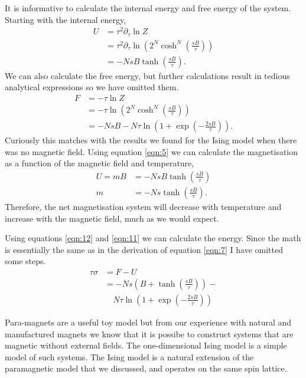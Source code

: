 \documentclass[a4paper, twocolumn]{article}
\begin{document}
It is informative to calculate the internal energy and free %
energy of the system. Starting with the internal energy,
%
\begin{align}
    U &= \tau^{2}\partial_{\tau}\ln Z\nonumber\\
        &= \tau^{2}\partial_{\tau}\ln\left(2^{N}\cosh^{N}
            \left(\frac{sB}{\tau}\right)\right)\nonumber\\
        &= -NsB\tanh\left(\frac{sB}{\tau}\right).
    \label{eqn:10}
\end{align}
%
We can also calculate the free energy, but further calculations %
result in tedious analytical expressions so we have omitted them. %
%
\begin{align}
    F &= -\tau\ln Z\nonumber\\
        &= -\tau\ln\left(2^{N}\cosh^{N}\left(\frac{sB}{\tau}
            \right)\right)\nonumber\\
        &= -NsB - N\tau\ln\left(1 + \exp\left(-\frac{2sB}{\tau}\right)
            \right).
    \label{eqn:11}
\end{align}
%
Curiously this matches with the results we found for the Ising %
model when there was no magnetic field. Using %
equation \ref{eqn:5} we can calculate the magnetisation as a function %
of the magnetic field and temperature, 
%
\begin{align}
    U = mB &= -NsB\tanh\left(\frac{sB}{\tau}\right)\nonumber\\
        m &= -Ns\tanh\left(\frac{sB}{\tau}\right).
    \label{eqn:12}
\end{align}
%
Therefore, the net magnetisation system will decrease with %
temperature and increase with the magnetic field, much as we %
would expect. 


Using equations \ref{eqn:12} and \ref{eqn:11} we can calculate the %
energy. Since the math is essentially the same as in the derivation %
of equation \ref{eqn:7} I have omitted some steps. 
%
\begin{align}
    \tau\sigma &= F - U \nonumber \\ 
        &= -Ns\left(B + \tanh\left(\frac{sB}{\tau}\right)\right) - \nonumber \\ 
        &\quad N\tau\ln\left(1 + \exp\left(-\frac{2sB}{\tau}\right)\right) 
    \label{eqn:13}
\end{align}


Para-magnets are a useful toy model but from our experience %
with natural and manufactured magnets we know that it is %
possibe to construct systems that are magnetic without external %
fields. The one-dimensional Ising model is a simple model of %
such systems. The Ising model is a natural extension of the %
paramagnetic model that we discussed, and operates on the same %
spin lattice. 
\end{document}
